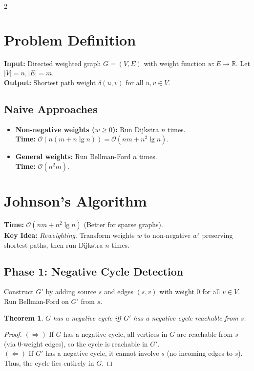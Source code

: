 \documentclass[10pt, a4paper]{article}
\newcommand{\BigO}[1]{\mathcal{O}(#1)}
\newcommand{\dist}{\delta}
\theoremstyle{compact}
\newtheorem*{theorem}{Theorem}
\begin{document}
\begin{multicols*}{2}

\section{Problem Definition}
\textbf{Input:} Directed weighted graph $G=(V,E)$ with weight function $w: E \to \mathbb{R}$. Let $|V|=n, |E|=m$. \\
\textbf{Output:} Shortest path weight $\dist(u,v)$ for all $u, v \in V$.

\subsection{Naive Approaches}
\begin{itemize}[leftmargin=*]
    \item \textbf{Non-negative weights ($w \ge 0$):} Run Dijkstra $n$ times.
    \\ \textbf{Time:} $\BigO{n(m + n \lg n)} = \BigO{nm + n^2 \lg n}$.
    \item \textbf{General weights:} Run Bellman-Ford $n$ times.
    \\ \textbf{Time:} $\BigO{n^2 m}$.
\end{itemize}

\section{Johnson's Algorithm}
\textbf{Time:} $\BigO{nm + n^2 \lg n}$ (Better for sparse graphs). \\
\textbf{Key Idea:} \textit{Reweighting}. Transform weights $w$ to non-negative $w'$ preserving shortest paths, then run Dijkstra $n$ times.

\subsection{Phase 1: Negative Cycle Detection}
Construct $G'$ by adding source $s$ and edges $(s,v)$ with weight 0 for all $v \in V$. Run Bellman-Ford on $G'$ from $s$.
\begin{theorem}
$G$ has a negative cycle iff $G'$ has a negative cycle reachable from $s$.
\end{theorem}
\begin{proof}
$(\Rightarrow)$ If $G$ has a negative cycle, all vertices in $G$ are reachable from $s$ (via 0-weight edges), so the cycle is reachable in $G'$. \\
$(\Leftarrow)$ If $G'$ has a negative cycle, it cannot involve $s$ (no incoming edges to $s$). Thus, the cycle lies entirely in $G$.
\end{proof}


\end{multicols*}
\end{document}
